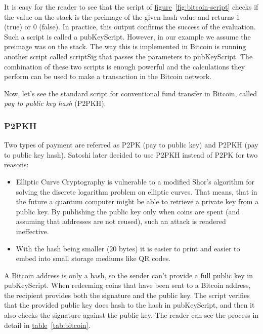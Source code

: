 It is easy for the reader to see that the script of \hyperref[fig:bitcoin-script]{figure}~\ref{fig:bitcoin-script} checks if the value on the stack is the preimage of the given hash value and returns 1 (true) or 0 (false). In practice, this output confirms the success of the evaluation. Such a script is called a \textsf{pubKeyScript}. However, in our example we assume the preimage was on the stack. The way this is implemented in Bitcoin is running another script called \textsf{scriptSig} that passes the parameters to \textsf{pubKeyScript}. The combination of these two scripts is enough powerful and the calculations they perform can be used to make a transaction in the Bitcoin network.

Now, let's see the standard script for conventional fund transfer in Bitcoin, called \emph{pay to public key hash} (P2PKH).



\subsubsection{P2PKH}
Two types of payment are referred as P2PK (pay to public key) and P2PKH (pay to public key hash).
Satoshi later decided to use P2PKH instead of P2PK for two reasons:

\begin{itemize}
  \item Elliptic Curve Cryptography is vulnerable to a modified Shor's algorithm for solving the discrete logarithm problem on elliptic curves. That means, that in the future a quantum computer might be able to retrieve a private key from a public key. By publishing the public key only when coins are spent (and assuming that addresses are not reused), such an attack is rendered ineffective.
  \item With the hash being smaller (20 bytes) it is easier to print and easier to embed into small storage mediums like QR codes.
\end{itemize}

A Bitcoin address is only a hash, so the sender can't provide a full public key in \textsf{pubKeyScript}. When redeeming coins that have been sent to a Bitcoin address, the recipient provides both the signature and the public key. The script verifies that the provided public key does hash to the hash in \textsf{pubKeyScript}, and then it also checks the signature against the public key. The reader can see the process in detail in \hyperref[tab:bitcoin]{table}~\ref{tab:bitcoin}.

